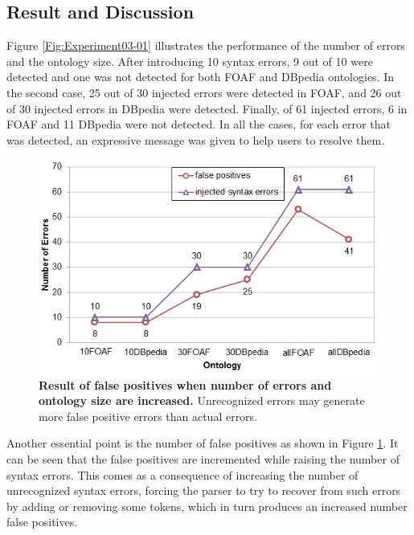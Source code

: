 \subsection{Result and Discussion}
Figure \ref{Fig:Experiment03-01} illustrates the performance of the number of errors and the ontology size. 
After introducing 10 syntax errors, 9 out of 10 were detected and one was not detected for both FOAF and DBpedia ontologies. 
In the second case, 25 out of 30 injected errors were detected in FOAF, and 26 out of 30 injected errors in DBpedia were detected. 
Finally, of 61 injected errors, 6 in FOAF and 11 DBpedia were not detected.
In all the cases, for each error that was detected, an expressive message was given to help users to resolve them. 




\begin{figure}[ht]
\begin{center}
		\includegraphics[scale=0.9,angle=0]{images/Experiment03-02.png}
		\vspace*{-4mm}
		\caption{\textbf{Result of false positives when number of errors and ontology size are increased.} Unrecognized errors may generate more false positive errors than actual errors. 
		}
   \label{Fig:Experiment03-02}
\end{center}
\end{figure}
Another essential point is the number of false positives as shown in Figure \ref{Fig:Experiment03-02}. 
It can be seen that the false positives are incremented while raising the number of syntax errors.
This comes as a consequence of increasing the number of unrecognized syntax errors, forcing the parser to try to recover from such errors by adding or removing some tokens, which in turn produces an increased number false positives.   


